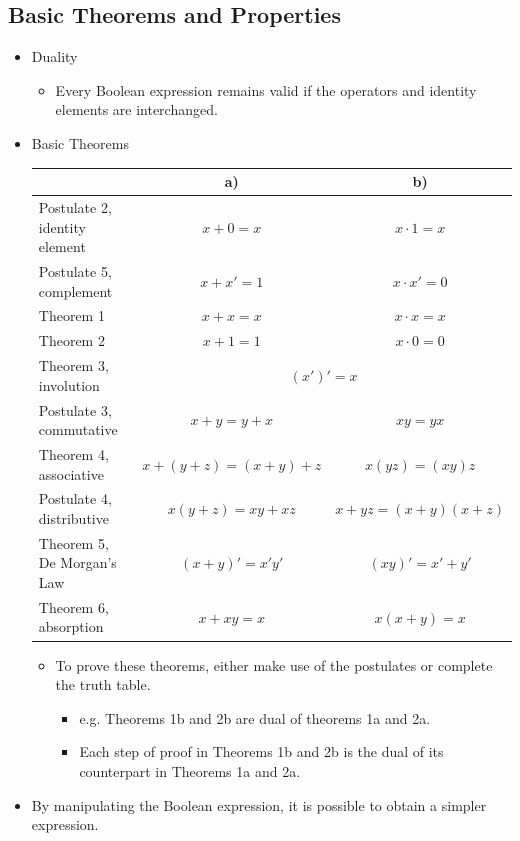 \documentclass[a4paper]{article}
\begin{document}
\subsection{Basic Theorems and Properties}
\begin{itemize}
    \item Duality
    \begin{itemize}[label=$\circ$]
        \item Every Boolean expression remains valid if the operators and identity elements are interchanged.
    \end{itemize}
    \item Basic Theorems
    \begin{table}[H]
    \centering
    \begin{tabular}{l|c|c|}
    \cline{2-3}
     & \textbf{a)} & \textbf{b)} \\ \hline
    \multicolumn{1}{|l|}{Postulate 2, identity element} & $x + 0 = x$ & $x\cdot 1 = x$ \\ \hline
    \multicolumn{1}{|l|}{Postulate 5, complement} & $x+x' = 1$ & $x\cdot x' = 0$ \\ \hline
    \multicolumn{1}{|l|}{Theorem 1} & $x + x = x$ & $x\cdot x = x$ \\ \hline
    \multicolumn{1}{|l|}{Theorem 2} & $x + 1 = 1$ & $x\cdot 0 = 0$ \\ \hline
    \multicolumn{1}{|l|}{Theorem 3, involution} & \multicolumn{2}{c|}{$(x')' = x$} \\ \hline
    \multicolumn{1}{|l|}{Postulate 3, commutative} & $x + y = y + x$ & $xy = yx$ \\ \hline
    \multicolumn{1}{|l|}{Theorem 4, associative} & $x + (y + z) = (x + y) + z$ & $x(yz) = (xy)z$ \\ \hline
    \multicolumn{1}{|l|}{Postulate 4, distributive} & $x(y + z) = xy + xz$ & $x + yz = (x + y)(x + z)$ \\ \hline
    \multicolumn{1}{|l|}{Theorem 5, De Morgan's Law} & $(x + y)' = x'y'$ & $(xy)' = x' + y'$ \\ \hline
    \multicolumn{1}{|l|}{Theorem 6, absorption} & $x + xy = x$ & $x(x +y) = x$ \\ \hline
    \end{tabular}
    \end{table}
    \begin{itemize}[label=$\circ$]
        \item To prove these theorems, either make use of the postulates or complete the truth table.
        \begin{itemize}[label=\tiny$\blacksquare$]
        \item e.g. Theorems 1b and 2b are dual of theorems 1a and 2a. 
        \item Each step of proof in Theorems 1b and 2b is the dual of its counterpart in Theorems 1a and 2a.
    \end{itemize}
    \end{itemize}
    \item By manipulating the Boolean expression, it is possible to obtain a simpler expression.
\end{itemize}
\end{document}
